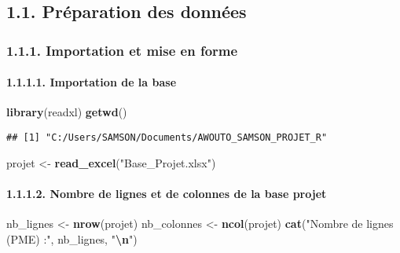 \documentclass[
]{article}
\newenvironment{Shaded}{\begin{snugshade}}{\end{snugshade}}
\newcommand{\FunctionTok}[1]{\textcolor[rgb]{0.13,0.29,0.53}{\textbf{#1}}}
\newcommand{\NormalTok}[1]{#1}
\newcommand{\OtherTok}[1]{\textcolor[rgb]{0.56,0.35,0.01}{#1}}
\newcommand{\SpecialCharTok}[1]{\textcolor[rgb]{0.81,0.36,0.00}{\textbf{#1}}}
\newcommand{\StringTok}[1]{\textcolor[rgb]{0.31,0.60,0.02}{#1}}
\begin{document}
\hypertarget{pruxe9paration-des-donnuxe9es}{%
\subsection{1.1. Préparation des
données}\label{pruxe9paration-des-donnuxe9es}}

\hypertarget{importation-et-mise-en-forme}{%
\subsubsection{1.1.1. Importation et mise en
forme}\label{importation-et-mise-en-forme}}

\hypertarget{importation-de-la-base}{%
\paragraph{1.1.1.1. Importation de la
base}\label{importation-de-la-base}}

\begin{Shaded}
\begin{Highlighting}[]
\FunctionTok{library}\NormalTok{(readxl)}
\FunctionTok{getwd}\NormalTok{()}
\end{Highlighting}
\end{Shaded}

\begin{verbatim}
## [1] "C:/Users/SAMSON/Documents/AWOUTO_SAMSON_PROJET_R"
\end{verbatim}

\begin{Shaded}
\begin{Highlighting}[]
\NormalTok{projet }\OtherTok{\textless{}{-}} \FunctionTok{read\_excel}\NormalTok{(}\StringTok{"Base\_Projet.xlsx"}\NormalTok{)}
\end{Highlighting}
\end{Shaded}

\hypertarget{nombre-de-lignes-et-de-colonnes-de-la-base-projet}{%
\paragraph{1.1.1.2. Nombre de lignes et de colonnes de la base
projet}\label{nombre-de-lignes-et-de-colonnes-de-la-base-projet}}

\begin{Shaded}
\begin{Highlighting}[]
\NormalTok{nb\_lignes }\OtherTok{\textless{}{-}} \FunctionTok{nrow}\NormalTok{(projet)}
\NormalTok{nb\_colonnes }\OtherTok{\textless{}{-}} \FunctionTok{ncol}\NormalTok{(projet)}
\FunctionTok{cat}\NormalTok{(}\StringTok{"Nombre de lignes (PME) :"}\NormalTok{, nb\_lignes, }\StringTok{"}\SpecialCharTok{\textbackslash{}n}\StringTok{"}\NormalTok{)}
\end{Highlighting}
\end{Shaded}
\end{document}
